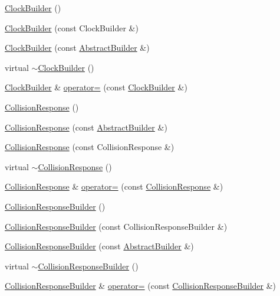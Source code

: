 \begin{DoxyCompactItemize}
\hyperlink{namespacejli_af9355f336950e30078eac279a96a7375}{Clock\+Builder} ()
\item 
\hyperlink{namespacejli_a59f88ada47f2f75bad05d58b79344dd1}{Clock\+Builder} (const Clock\+Builder \&)
\item 
\hyperlink{namespacejli_a6eb2d97c9c7e59378580ac6637daf99c}{Clock\+Builder} (const \hyperlink{classjli_1_1_abstract_builder}{Abstract\+Builder} \&)
\item 
virtual \hyperlink{namespacejli_aedf4fd3834c4b8806fa9a257d496df30}{$\sim$\+Clock\+Builder} ()
\item 
\hyperlink{namespacejli_af9355f336950e30078eac279a96a7375}{Clock\+Builder} \& \hyperlink{namespacejli_ab2df9e6084dba760e66f854ddaed69ff}{operator=} (const \hyperlink{namespacejli_af9355f336950e30078eac279a96a7375}{Clock\+Builder} \&)
\item 
\hyperlink{namespacejli_ade7f2a4f2880c0d04736c3677ff61c1a}{Collision\+Response} ()
\item 
\hyperlink{namespacejli_a5253cd6674cbb5acad943c6652f1941d}{Collision\+Response} (const \hyperlink{classjli_1_1_abstract_builder}{Abstract\+Builder} \&)
\item 
\hyperlink{namespacejli_aa016cba40071d115792a6ab008cc30c5}{Collision\+Response} (const Collision\+Response \&)
\item 
virtual \hyperlink{namespacejli_ad8c3da9eb7afceee20db6db716280ce0}{$\sim$\+Collision\+Response} ()
\item 
\hyperlink{namespacejli_ade7f2a4f2880c0d04736c3677ff61c1a}{Collision\+Response} \& \hyperlink{namespacejli_ac9b74cda6418ae6175a9178669229562}{operator=} (const \hyperlink{namespacejli_ade7f2a4f2880c0d04736c3677ff61c1a}{Collision\+Response} \&)
\item 
\hyperlink{namespacejli_aba46547ac77fd775617b1e9c5c4c3807}{Collision\+Response\+Builder} ()
\item 
\hyperlink{namespacejli_ade55a82bdee00c30fda3b15d26caca25}{Collision\+Response\+Builder} (const Collision\+Response\+Builder \&)
\item 
\hyperlink{namespacejli_a921545297d17ff8c23fcab0bb4a2a67f}{Collision\+Response\+Builder} (const \hyperlink{classjli_1_1_abstract_builder}{Abstract\+Builder} \&)
\item 
virtual \hyperlink{namespacejli_a92b1a214131802c7cde48d0908a810e1}{$\sim$\+Collision\+Response\+Builder} ()
\item 
\hyperlink{namespacejli_aba46547ac77fd775617b1e9c5c4c3807}{Collision\+Response\+Builder} \& \hyperlink{namespacejli_ad3d3c1fad0e4aea9e098049aded55a07}{operator=} (const \hyperlink{namespacejli_aba46547ac77fd775617b1e9c5c4c3807}{Collision\+Response\+Builder} \&)

\end{DoxyCompactItemize}
